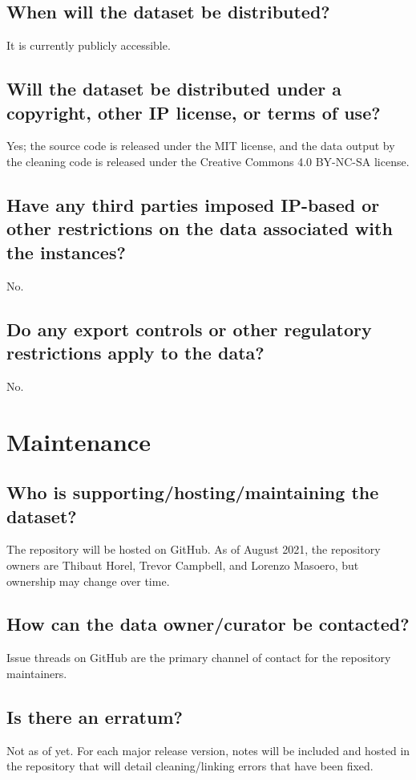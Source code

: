 \documentclass[letterpaper, 10 pt, conference]{ieeeconf}  %
\begin{document}
\subsection{When will the dataset be distributed?}
It is currently publicly accessible.

\subsection{Will the dataset be distributed under a copyright, other IP license, or terms of use?}
Yes; the source code is released under the MIT license, and the data output by the cleaning code is released under the Creative Commons 4.0 BY-NC-SA license.

\subsection{Have any third parties imposed IP-based or other restrictions on the data associated with the instances?}
No.

\subsection{Do any export controls or other regulatory restrictions apply to the data?}
No.

\section{Maintenance}

\subsection{Who is supporting/hosting/maintaining the dataset?}
The repository will be hosted on GitHub. As of August 2021, the repository
owners are Thibaut Horel, Trevor Campbell, and Lorenzo Masoero, but ownership
may change over time.

\subsection{How can the data owner/curator be contacted?}
Issue threads on GitHub are the primary channel of contact for the repository maintainers.

\subsection{Is there an erratum?}
Not as of yet. For each major release version, notes will be included and
hosted in the repository that will detail cleaning/linking errors that have been fixed.
\end{document}
